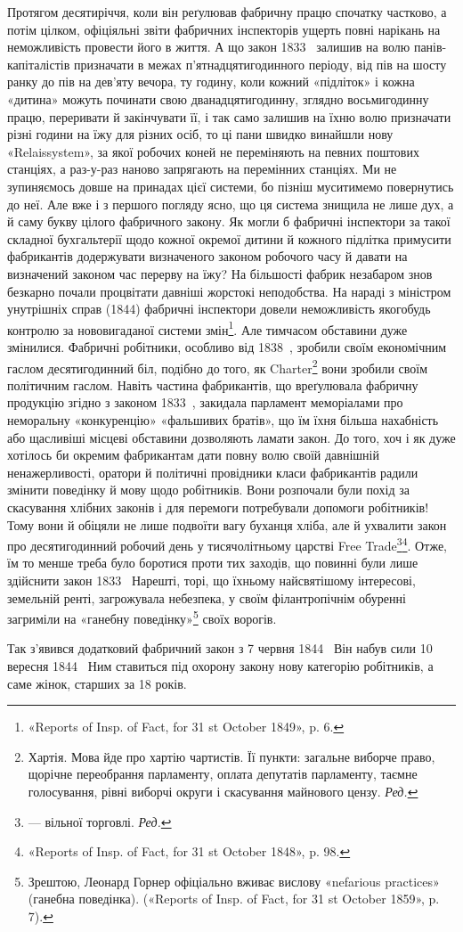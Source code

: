 Протягом десятиріччя, коли він реґулював фабричну працю
спочатку частково, а потім цілком, офіціяльні звіти фабричних
інспекторів ущерть повні нарікань на неможливість провести його
в життя. А що закон 1833~ залишив на волю панів-капіталістів
призначати в межах п’ятнадцятигодинного періоду, від пів на шосту
ранку до пів на дев’яту вечора, ту годину, коли кожний «підліток»
і кожна «дитина» можуть починати свою дванадцятигодинну,
зглядно восьмигодинну працю, переривати й закінчувати
її, і так само залишив на їхню волю призначати різні години
на їжу для різних осіб, то ці пани швидко винайшли нову
«Relaissystem», за якої робочих коней не переміняють на певних
поштових станціях, а раз-у-раз наново запрягають на перемінних
станціях. Ми не зупиняємось довше на принадах цієї
системи, бо пізніш муситимемо повернутись до неї. Але вже і з
першого погляду ясно, що ця система знищила не лише дух, а й
саму букву цілого фабричного закону. Як могли б фабричні
інспектори за такої складної бухгальтерії щодо кожної окремої
дитини й кожного підлітка примусити фабрикантів додержувати
визначеного законом робочого часу й давати на визначений законом
час перерву на їжу? На більшості фабрик незабаром знов
безкарно почали процвітати давніші жорстокі неподобства.
На нараді з міністром унутрішніх справ (1844) фабричні інспектори
довели неможливість якогобудь контролю за нововигаданої
системи змін\footnote{
«Reports of Insp. of Fact, for 31 st October 1849», p. 6.
}. Але тимчасом обставини дуже змінилися. Фабричні
робітники, особливо від 1838~, зробили своїм економічним гаслом
десятигодинний біл, подібно до того, як Charter\footnote*{
Хартія. Мова йде про хартію чартистів. Її пункти: загальне виборче
право, щорічне переобрання парламенту, оплата депутатів парламенту,
таємне голосування, рівні виборчі округи і скасування майнового
цензу. \emph{Ред.}
} вони зробили своїм
політичним гаслом. Навіть частина фабрикантів, що вреґулювала
фабричну продукцію згідно з законом 1833~, закидала парламент
меморіалами про неморальну «конкуренцію» «фальшивих братів»,
що їм їхня більша нахабність або щасливіші місцеві обставини
дозволяють ламати закон. До того, хоч і як дуже хотілось би
окремим фабрикантам дати повну волю своїй давнішній ненажерливості,
оратори й політичні провідники класи фабрикантів радили
змінити поведінку й мову щодо робітників. Вони розпочали
були похід за скасування хлібних законів і для перемоги потребували
допомоги робітників! Тому вони й обіцяли не лише подвоїти
вагу буханця хліба, але й ухвалити закон про десятигодинний
робочий день у тисячолітньому царстві Free Trade\footnote*{
— вільної торговлі. \emph{Ред.}
}\footnote{
«Reports of Insp. of Fact, for 31 st October 1848», p. 98.
}. Отже, їм то менше треба було боротися проти тих заходів, що
повинні були лише здійснити закон 1833~ Нарешті, торі, що їхньому
найсвятішому інтересові, земельній ренті, загрожувала
небезпека, у своїм філантропічнім обуренні загриміли на «ганебну
поведінку»\footnote{
Зрештою, Леонард Горнер офіціально вживає вислову «nefarious
practices» (ганебна поведінка). («Reports of Insp. of Fact, for 31 st
October 1859», p. 7).
} своїх ворогів.

Так з’явився додатковий фабричний закон з 7 червня 1844~
Він набув сили 10 вересня 1844~ Ним ставиться під охорону закону
нову категорію робітників, а саме жінок, старших за 18 років.
\parbreak{}  %
